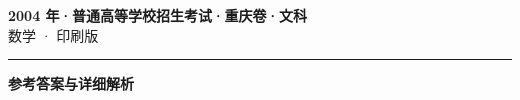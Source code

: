 \documentclass[zihao=5, a4paper]{ctexart}
\begin{document}
\begin{center}
  {\Large\bfseries 2004 年·普通高等学校招生考试·重庆卷·文科}\\[4pt]
  {\large 数学 · 印刷版}
\end{center}
\medskip
{}

\par\bigskip\hrule\bigskip
{}
\begin{center}{\large\bfseries 参考答案与详细解析}\end{center}
\smallskip

\end{document}
